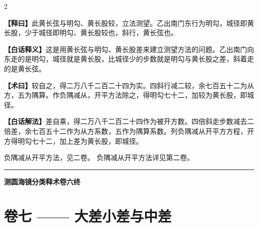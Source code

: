 \documentclass[11pt,a4paper]{article}
\newcommand{\WenExplain}{\textcolor{classicalcolor}{\textbf{【释曰】}}}
\newcommand{\BaiExplain}{\textcolor{moderncolor}{\textbf{【白话释义】}}}
\newcommand{\WenMethod}{\textcolor{classicalcolor}{\textbf{【术曰】}}}
\newcommand{\BaiMethod}{\textcolor{moderncolor}{\textbf{【白话解法】}}}
\begin{document}
\begin{paracol}{2}
\switchcolumn*
\begin{tcolorbox}[colback=red!5,colframe=red!30!black,boxrule=0.3pt]
\WenExplain\quad 此黄长弦与明勾、黄长股较，立法测望。乙出南门东行为明勾，城径即黄长股，少于城径即明勾、黄长股较也，斜行，黄长弦也。
\end{tcolorbox}
\switchcolumn
\begin{tcolorbox}[colback=blue!5,colframe=blue!30!black,boxrule=0.3pt]
\BaiExplain\quad 这是用黄长弦与明勾、黄长股差来建立测望方法的问题。乙出南门向东走的是明勾，城径就是黄长股，比城径少的步数就是明勾与黄长股之差，斜着走的是黄长弦。
\end{tcolorbox}

\switchcolumn*
\begin{tcolorbox}[colback=red!5,colframe=red!40!black,boxrule=0.3pt]
\WenMethod\quad 较自之，得二万八千二百二十四为实。四斜行减二较，余七百五十二为从方，五为隅算。作负隅减从，开平方法除之，得明勾七十二，加较为黄长股，即城径。
\end{tcolorbox}
\switchcolumn
\begin{tcolorbox}[colback=blue!5,colframe=blue!40!black,boxrule=0.3pt]
\BaiMethod\quad 差自乘，得二万八千二百二十四作为被开方数。四倍斜走步数减去二倍差，余七百五十二作为从方系数，五作为隅算系数。列负隅减从开平方方程，开方得明勾七十二，加上差为黄长股，即城径。
\end{tcolorbox}

\switchcolumn*
\small 负隅减从开平方法，见二卷。
\switchcolumn
\small 负隅减从开平方法详见第二卷。

\end{paracol}

\vspace{1em}
\begin{center}
\rule{0.5\textwidth}{0.4pt}

\textbf{\textcolor{volumecolor}{测圆海镜分类释术卷六终}}
\end{center}



\newpage
\section*{\textcolor{volumecolor}{卷七} —— 大差小差与中差}
\end{document}
